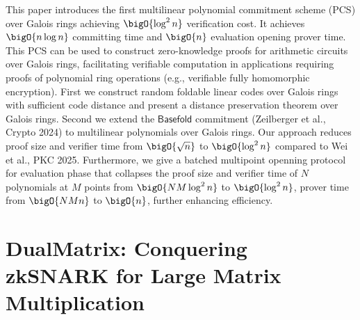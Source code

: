 \documentclass[11pt,oneside]{book}
\theoremstyle{definition}
\theoremstyle{remark}
\theoremstyle{plain}
\begin{document}
This paper introduces the first multilinear polynomial commitment scheme (PCS) over Galois rings achieving $\bigO{\log^2 n}$ verification cost. It achieves $\bigO{n\log n}$ committing time and $\bigO{n}$ evaluation opening prover time. This PCS can be used to construct zero-knowledge proofs for arithmetic circuits over Galois rings, facilitating verifiable computation in applications requiring proofs of polynomial ring operations (e.g., verifiable fully homomorphic encryption). First we construct random foldable linear codes over Galois rings with sufficient code distance and present a distance preservation theorem over Galois rings. Second we extend the $\textsf{Basefold}$ commitment (Zeilberger et al., Crypto 2024) to multilinear polynomials over Galois rings. Our approach reduces proof size and verifier time from $\bigO{\sqrt{n}}$ to $\bigO{\log^2 n}$ compared to Wei et al., PKC 2025. Furthermore, we give a batched multipoint openning protocol for evaluation phase that collapses the proof size and verifier time of $N$ polynomials at $M$ points from $\bigO{NM \log^2 n}$ to $\bigO{\log^2 n}$, prover time from $\bigO{NMn}$ to $\bigO{n}$, further enhancing efficiency.

\section{\cite{cryptoeprint:2025/1768} DualMatrix: Conquering zkSNARK for Large Matrix Multiplication}
\end{document}
